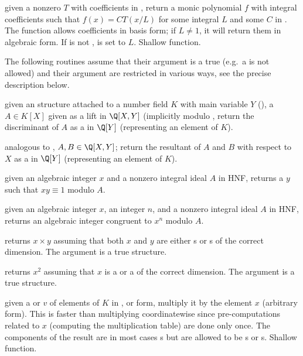  given a nonzero  $T$
with coefficients in , return a monic polynomial $f$ with integral
coefficients such that $f(x) = C T(x/L)$ for some integral $L$ and some $C$
in . The function allows coefficients in basis form; if $L \neq 1$,
it will return them in algebraic form. If  is not ,
 is set to $L$. Shallow function.

 The following routines assume that their 
argument is a true  (e.g.~a  is not allowed) and their
argument are restricted in various ways, see the precise description below.

 given an  structure attached to a
number field $K$ with main variable $Y$ (), a 
$A \in K[X]$ given as a lift in $\Q[X,Y]$ (implicitly modulo
, return the discriminant of $A$ as a  in
$\Q[Y]$ (representing an element of $K$).

 analogous to ,
$A, B\in \Q[X,Y]$; return the resultant of $A$ and $B$ with respect to $X$
as a  in $\Q[Y]$ (representing an element of $K$).

 given an algebraic integer
$x$ and a nonzero integral ideal $A$ in HNF, returns a $y$ such that
$xy \equiv 1$ modulo $A$.

 given an algebraic
integer $x$, an integer $n$, and a nonzero integral ideal $A$ in HNF,
returns an algebraic integer congruent to $x^n$ modulo $A$.

 returns $x\times y$ assuming
that both $x$ and $y$ are either s or s of the correct
dimension. The argument  is a true  structure.

 returns $x^2$ assuming that $x$ is a
 or a  of the correct dimension. The argument  is a
true  structure.

 given a  or 
$v$ of elements of $K$ in ,  or  form, multiply
it by the element $x$ (arbitrary form). This is faster than multiplying
coordinatewise since pre-computations related to $x$ (computing the
multiplication table) are done only once. The components of the result
are in most cases s but are allowed to be s or s.
Shallow function.

